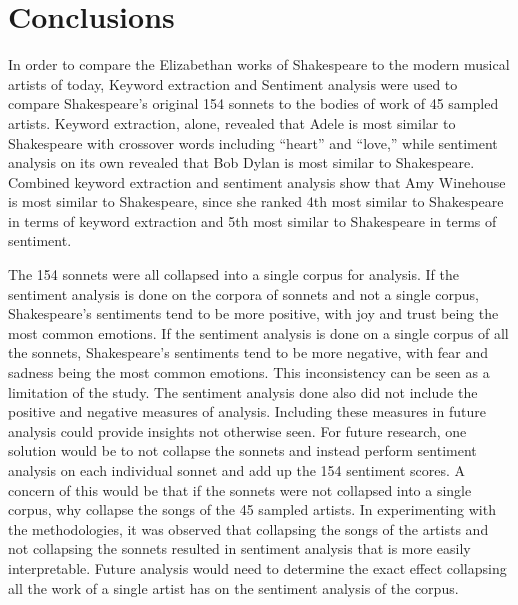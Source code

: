 \documentclass[10pt,a4paper]{article}
\begin{document}

\section{Conclusions}
In order to compare the Elizabethan works of Shakespeare to the modern musical artists of today, Keyword extraction and Sentiment analysis were used to compare Shakespeare’s original 154 sonnets to the bodies of work of 45 sampled artists. Keyword extraction, alone, revealed that Adele is most similar to Shakespeare with crossover words including “heart” and “love,” while sentiment analysis on its own revealed that Bob Dylan is most similar to Shakespeare. Combined keyword extraction and sentiment analysis show that Amy Winehouse is most similar to Shakespeare, since she ranked 4th most similar to Shakespeare in terms of keyword extraction and 5th most similar to Shakespeare in terms of sentiment. 

\noindent The 154 sonnets were all collapsed into a single corpus for analysis. If the sentiment analysis is done on the corpora of sonnets and not a single corpus, Shakespeare’s sentiments tend to be more positive, with joy and trust being the most common emotions. If the sentiment analysis is done on a single corpus of all the sonnets, Shakespeare’s sentiments tend to be more negative, with fear and sadness being the most common emotions. This inconsistency can be seen as a limitation of the study. The sentiment analysis done also did not include the positive and negative measures of analysis. Including these measures in future analysis could provide insights not otherwise seen. For future research, one solution would be to not collapse the sonnets and instead perform sentiment analysis on each individual sonnet and add up the 154 sentiment scores. A concern of this would be that if the sonnets were not collapsed into a single corpus, why collapse the songs of the 45 sampled artists. In experimenting with the methodologies, it was observed that collapsing the songs of the artists and not collapsing the sonnets resulted in sentiment analysis that is more easily interpretable. Future analysis would need to determine the exact effect collapsing all the work of a single artist has on the sentiment analysis of the corpus. 
\end{document}
